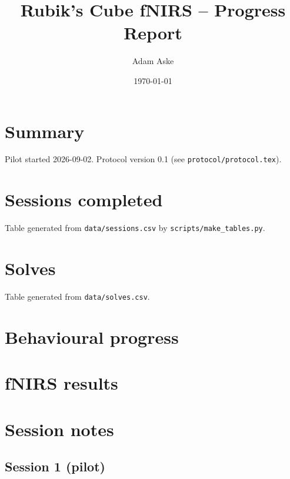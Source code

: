 \documentclass[11pt,a4paper]{article}
\title{Rubik's Cube fNIRS -- Progress Report}
\author{Adam Aske}
\date{\today}
\begin{document}
\maketitle

\section{Summary}
Pilot started 2026-09-02. Protocol version 0.1 (see \texttt{protocol/protocol.tex}).

\section{Sessions completed}
Table generated from \texttt{data/sessions.csv} by \texttt{scripts/make\_tables.py}.

\begin{center}
\small

\end{center}

\section{Solves}
Table generated from \texttt{data/solves.csv}.

\begin{center}
\scriptsize

\end{center}

\section{Behavioural progress}

\section{fNIRS results}

\section{Session notes}
\subsection*{Session 1 (pilot)}
\end{document}
